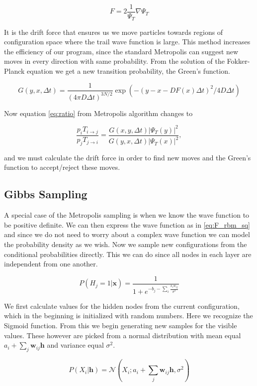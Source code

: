 $$F = 2 \frac{1}{\Psi_T} \nabla \Psi_T$$

It is the drift force that ensures us we move particles towards regions of configuration space where the trail wave function is large. This method increases the efficiency of our program, since the standard Metropolis can suggest new moves in every direction with same probability. 
From the solution of the Fokker-Planck equation we get a new transition probability, the Green's function. 

$$G(y, x, \Delta t) = \frac{1}{(4 \pi D \Delta t)^{3N/2}} \exp (-(y - x - D F(x) \Delta t)^2/4 D \Delta t)$$

Now equation \ref{eq:ratio} from Metropolis algorithm changes to 

$$\frac{p_i T_{i \rightarrow j}}{p_j T_{j \rightarrow i}} = \frac{G(x, y, \Delta t)|\Psi_T(y)|^2}{G(y, x, \Delta t)|\Psi_T(x)|^2},$$

and we must calculate the drift force in order to find new moves and the Green's function to accept/reject these moves.

\subsection{Gibbs Sampling}

A special case of the Metropolis sampling is when we know the wave function to be positive definite. We can then express the wave function as in \eqref{eq:F_rbm_sq} and since we do not need to worry about a complex wave function we can model the probability density as we wish. Now we sample new configurations from the conditional probabilities directly. This we can do since all nodes in each layer are independent from one another. 

\begin{equation}\label{eq:hidden}
P(H_j= 1|\mathbf{x}) = \frac{1}{1 + e^{- b_j - \sum_i\frac{x_i w_{ij}}{\sigma^2}}}
\end{equation}

We first calculate values for the hidden nodes from the current configuration, which in the beginning is initialized with random numbers. Here we recognize the Sigmoid function. From this we begin generating new samples for the visible values. These however are picked from a normal distribution with mean equal $a_i + \sum_j \mathbf{w}_{ij} \mathbf{h}$ and variance equal $\sigma^2$.

\begin{equation}\label{eq:visible}
P(X_i|\mathbf{h}) = \mathcal{N}(X_i;a_i + \sum_j \mathbf{w}_{ij} \mathbf{h}, \sigma^2)
\end{equation}

